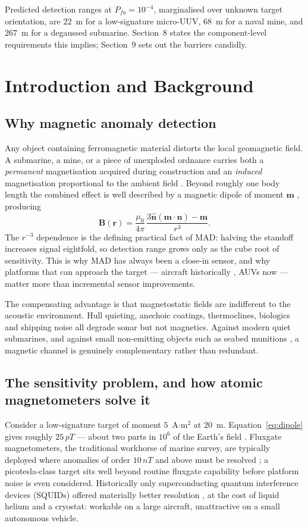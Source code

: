 \documentclass[11pt]{article}
\newcommand{\nT}{\,nT}\newcommand{\pT}{\,pT}\newcommand{\fT}{\,fT}
\begin{document}
Predicted detection ranges at $P_{fa}=10^{-4}$, marginalised over unknown target
orientation, are $22$~m for a low-signature micro-UUV, $68$~m for a naval mine,
and $267$~m for a degaussed submarine. Section~8 states the component-level
requirements this implies; Section~9 sets out the barriers candidly.

\section{Introduction and Background}
\subsection{Why magnetic anomaly detection}
Any object containing ferromagnetic material distorts the local geomagnetic
field. A submarine, a mine, or a piece of unexploded ordnance carries both a
\emph{permanent} magnetisation acquired during construction and an
\emph{induced} magnetisation proportional to the ambient field
\cite{tolles1950,gnadt2022}. Beyond roughly one body length the combined effect
is well described by a magnetic dipole of moment $\mathbf{m}$ \cite{jackson1998},
producing
\begin{equation}
\mathbf{B}(\mathbf{r})=\frac{\mu_0}{4\pi}\,
\frac{3\hat{\mathbf{n}}(\mathbf{m}\cdot\hat{\mathbf{n}})-\mathbf{m}}{r^{3}} .
\label{eq:dipole}
\end{equation}
The $r^{-3}$ dependence is the defining practical fact of MAD: halving the
standoff increases signal eightfold, so detection range grows only as the cube
root of sensitivity. This is why MAD has always been a close-in sensor, and why
platforms that can approach the target --- aircraft historically
\cite{tolles1950,gnadt2022}, AUVs now \cite{oehler2024,seidel2023} --- matter
more than incremental sensor improvements.

The compensating advantage is that magnetostatic fields are indifferent to the
acoustic environment. Hull quieting, anechoic coatings, thermoclines, biologics
and shipping noise all degrade sonar but not magnetics. Against modern quiet
submarines, and against small non-emitting objects such as seabed munitions
\cite{seidel2023,oehler2024}, a magnetic channel is genuinely complementary
rather than redundant.

\subsection{The sensitivity problem, and how atomic magnetometers solve it}
Consider a low-signature target of moment $5$~A$\cdot$m$^2$ at $20$~m.
Equation~\eqref{eq:dipole} gives roughly $25\pT$ --- about two parts in $10^{6}$
of the Earth's field \cite{ncei}. Fluxgate magnetometers, the traditional
workhorse of marine survey, are typically deployed where anomalies of order
$10\nT$ and above must be resolved \cite{oehler2024}; a picotesla-class target
sits well beyond routine fluxgate capability before platform noise is even
considered. Historically only superconducting quantum interference devices
(SQUIDs) offered materially better resolution \cite{budker2007,clem1997}, at the
cost of liquid helium and a cryostat: workable on a large aircraft, unattractive
on a small autonomous vehicle.
\end{document}
